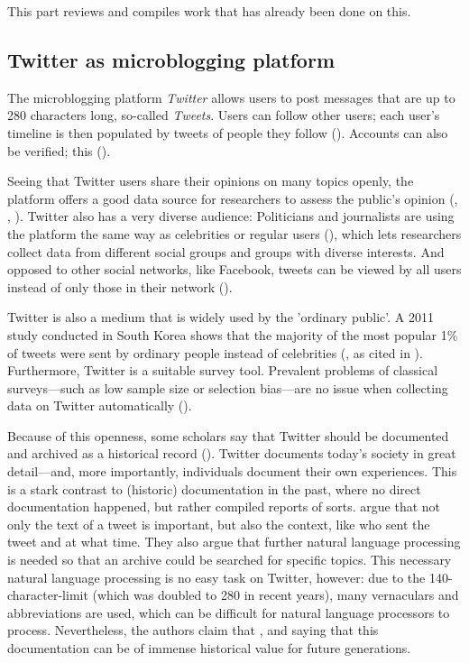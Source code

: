This part reviews and compiles work that has already been done on this.

\subsection{Twitter as microblogging platform}
The microblogging platform \emph{Twitter} allows users to post messages that are up to 280 characters long, so-called \emph{Tweets}. Users can follow other users; each user's timeline is then populated by tweets of people they follow (\cite{thimm2012}). Accounts can also be verified; this  (\cite{twitterinc.}). 

Seeing that Twitter users share their opinions on many topics openly, the platform offers a good data source for researchers to assess the public's opinion (\cite{pak2010twitter}, \cite{pfaffenberger2016twitter}, \cite{broniatowski2014twitter}). Twitter also has a very diverse audience: Politicians and journalists are using the platform the same way as celebrities or regular users (\cite{pak2010twitter}), which lets researchers collect data from different social groups and groups with diverse interests. And opposed to other social networks, like Facebook, tweets can be viewed by all users instead of only those in their network (\cite{park2013}).

Twitter is also a medium that is widely used by the 'ordinary public'. A 2011 study conducted in South Korea shows that the majority of the most popular 1\% of tweets were sent by ordinary people instead of celebrities (\cite{chang2011structure}, as cited in \cite{park2013}). Furthermore, Twitter is a suitable survey tool. Prevalent problems of classical surveys---such as low sample size or selection bias---are no issue when collecting data on Twitter automatically (\cite{takabe2016}). 

Because of this openness, some scholars say that Twitter should be documented and archived as a historical record (\cite{risse2014documenting}). Twitter documents today's society in great detail---and, more importantly, individuals document their own experiences. This is a stark contrast to (historic) documentation in the past, where no direct documentation happened, but rather compiled reports of sorts. \citeauthor{risse2014documenting} argue that not only the text of a tweet is important, but also the context, like who sent the tweet and at what time. They also argue that further natural language processing is needed so that an archive could be searched for specific topics. This necessary natural language processing is no easy task on Twitter, however: due to the 140-character-limit (which was doubled to 280 in recent years), many vernaculars and abbreviations are used, which can be difficult for natural language processors to process. Nevertheless, the authors claim that  \parencite[9]{risse2014documenting}, and saying that this documentation can be of immense historical value for future generations.

